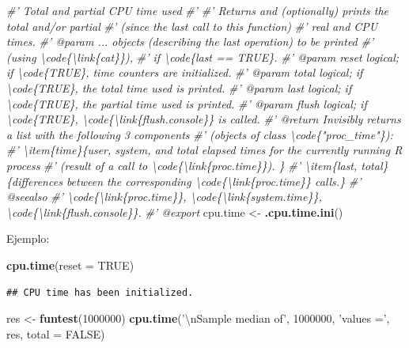 \documentclass[]{book}
\newenvironment{Shaded}{\begin{snugshade}}{\end{snugshade}}
\newcommand{\KeywordTok}[1]{\textcolor[rgb]{0.13,0.29,0.53}{\textbf{#1}}}
\newcommand{\DataTypeTok}[1]{\textcolor[rgb]{0.13,0.29,0.53}{#1}}
\newcommand{\DecValTok}[1]{\textcolor[rgb]{0.00,0.00,0.81}{#1}}
\newcommand{\CharTok}[1]{\textcolor[rgb]{0.31,0.60,0.02}{#1}}
\newcommand{\StringTok}[1]{\textcolor[rgb]{0.31,0.60,0.02}{#1}}
\newcommand{\CommentTok}[1]{\textcolor[rgb]{0.56,0.35,0.01}{\textit{#1}}}
\newcommand{\OtherTok}[1]{\textcolor[rgb]{0.56,0.35,0.01}{#1}}
\newcommand{\NormalTok}[1]{#1}
\theoremstyle{definition}
\theoremstyle{definition}
\theoremstyle{definition}
\theoremstyle{remark}
\begin{document}
\begin{Shaded}
\begin{Highlighting}[]
\CommentTok{#' Total and partial CPU time used}
\CommentTok{#' }
\CommentTok{#' Returns and (optionally) prints the total and/or partial }
\CommentTok{#' (since the last call to this function) }
\CommentTok{#' real and CPU times.}
\CommentTok{#' @param ... objects (describing the last operation) to be printed  }
\CommentTok{#' (using \textbackslash{}code\{\textbackslash{}link\{cat\}\}), }
\CommentTok{#' if \textbackslash{}code\{last == TRUE\}.}
\CommentTok{#' @param reset logical; if \textbackslash{}code\{TRUE\}, time counters are initialized. }
\CommentTok{#' @param total logical; if \textbackslash{}code\{TRUE\}, the total time used is printed. }
\CommentTok{#' @param last logical; if \textbackslash{}code\{TRUE\}, the partial time used is printed. }
\CommentTok{#' @param flush logical; if \textbackslash{}code\{TRUE\}, \textbackslash{}code\{\textbackslash{}link\{flush.console\}\} is called.}
\CommentTok{#' @return Invisibly returns a list with  the following 3 components }
\CommentTok{#' (objects of class \textbackslash{}code\{"proc_time"\}):}
\CommentTok{#' \textbackslash{}item\{time\}\{user, system, and total elapsed times for the currently running R process }
\CommentTok{#' (result of a call to \textbackslash{}code\{\textbackslash{}link\{proc.time\}\}). \}}
\CommentTok{#' \textbackslash{}item\{last, total\}\{differences between the corresponding \textbackslash{}code\{\textbackslash{}link\{proc.time\}\} calls.\}}
\CommentTok{#' @seealso}
\CommentTok{#' \textbackslash{}code\{\textbackslash{}link\{proc.time\}\}, \textbackslash{}code\{\textbackslash{}link\{system.time\}\}, \textbackslash{}code\{\textbackslash{}link\{flush.console\}\}.}
\CommentTok{#' @export}
\NormalTok{cpu.time <-}\StringTok{ }\KeywordTok{.cpu.time.ini}\NormalTok{()}
\end{Highlighting}
\end{Shaded}

Ejemplo:

\begin{Shaded}
\begin{Highlighting}[]
\KeywordTok{cpu.time}\NormalTok{(}\DataTypeTok{reset =} \OtherTok{TRUE}\NormalTok{)}
\end{Highlighting}
\end{Shaded}

\begin{verbatim}
## CPU time has been initialized.
\end{verbatim}

\begin{Shaded}
\begin{Highlighting}[]
\NormalTok{res <-}\StringTok{ }\KeywordTok{funtest}\NormalTok{(}\DecValTok{1000000}\NormalTok{)}
\KeywordTok{cpu.time}\NormalTok{(}\StringTok{'}\CharTok{\textbackslash{}n}\StringTok{Sample median of'}\NormalTok{, }\DecValTok{1000000}\NormalTok{, }\StringTok{'values ='}\NormalTok{, res, }\DataTypeTok{total =} \OtherTok{FALSE}\NormalTok{)}
\end{Highlighting}
\end{Shaded}
\end{document}
